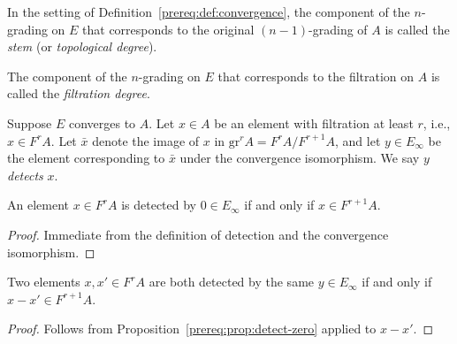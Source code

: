 \begin{definition}\label{prereq:def:stem}
    \leanok
    In the setting of Definition~\ref{prereq:def:convergence}, the component of the $n$-grading on $E$ that corresponds to the original $(n-1)$-grading of $A$ is called the \emph{stem} (or \emph{topological degree}).
\end{definition}

\begin{definition}\label{prereq:def:filtration-degree}
    \leanok
    The component of the $n$-grading on $E$ that corresponds to the filtration on $A$ is called the \emph{filtration degree}.
\end{definition}

\begin{definition}\label{prereq:def:detect}
    \leanok
    Suppose $E$ converges to $A$. Let $x \in A$ be an element with filtration at least $r$, i.e., $x \in F^r A$. Let $\bar{x}$ denote the image of $x$ in $\mathrm{gr}^r A = F^r A / F^{r+1} A$, and let $y \in E_\infty$ be the element corresponding to $\bar{x}$ under the convergence isomorphism. We say $y$ \emph{detects} $x$.
\end{definition}

\begin{proposition}\label{prereq:prop:detect-zero}
    \leanok
    An element $x \in F^r A$ is detected by $0 \in E_\infty$ if and only if $x \in F^{r+1} A$.
\end{proposition}
\begin{proof}\leanok Immediate from the definition of detection and the convergence isomorphism.\end{proof}

\begin{proposition}\label{prereq:prop:detect-difference}
    \leanok
    Two elements $x, x' \in F^r A$ are both detected by the same $y \in E_\infty$ if and only if $x - x' \in F^{r+1} A$.
\end{proposition}
\begin{proof}\leanok Follows from Proposition~\ref{prereq:prop:detect-zero} applied to $x - x'$.\end{proof}

